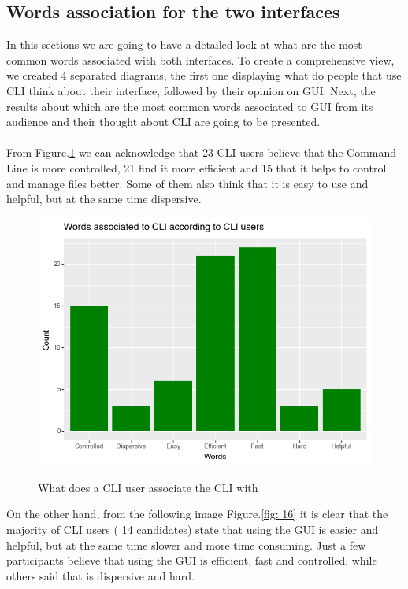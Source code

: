 \documentclass[]{report}
\begin{document}
	\subsection{Words association for the two interfaces}
	
	In this sections we are going to have a detailed look at what are the most common words associated with both interfaces. To create a comprehensive view, we created 4 separated diagrams, the first one displaying what do people that use CLI think about their interface, followed by their opinion on GUI. Next, the results about which are the most common words associated to GUI from its audience and their thought about CLI are going to be presented.\\\\

	From Figure.\ref{fig: 15} we can acknowledge that 23 CLI users believe that the Command Line is more controlled, 21 find it more efficient and 15 that it helps to control and manage files better. Some of them also think that it is easy to use and helpful, but at the same time dispersive.
	
	\begin{figure}[H]
		\centering
		\includegraphics[width=0.75\linewidth]{WordsCLIFromCLI}\\
		\caption{What does a CLI user associate the CLI with}
		\label{fig: 15}
	\end{figure}
	
	On the other hand, from the following image Figure.\ref{fig: 16} it is clear that the majority of CLI users ( 14 candidates) state that using the GUI is easier and helpful, but at the same time slower and more time consuming. Just a few participants believe that using the GUI is efficient, fast and controlled, while others said that is dispersive and hard.
	
\end{document}
